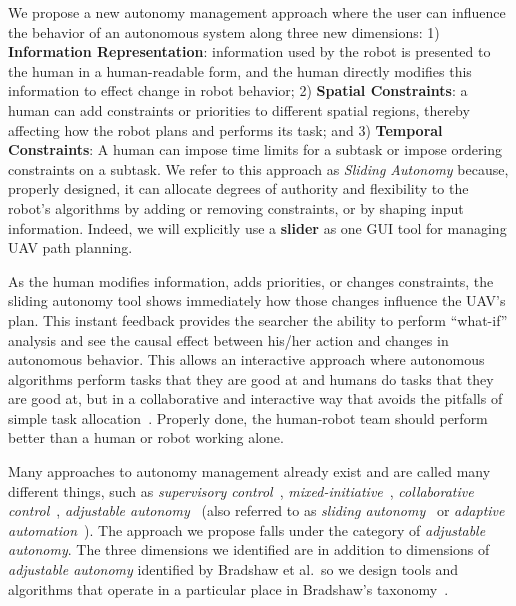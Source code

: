 We propose a new autonomy management approach where the user can influence the behavior of an autonomous system along three new dimensions: 1) \textbf{Information Representation}: information used by the robot is presented to the human in a human-readable form, and the human directly modifies this information to effect change in robot behavior; 2) \textbf{Spatial Constraints}: a human can add constraints or priorities to different spatial regions, thereby affecting how the robot plans and performs its task; and 3) \textbf{Temporal Constraints}: A human can impose time limits for a subtask or impose ordering constraints on a subtask. We refer to this approach as \textit{Sliding Autonomy} because, properly designed, it can allocate degrees of authority and flexibility to the robot's algorithms by adding or removing constraints, or by shaping input information. Indeed, we will explicitly use a \textbf{slider} as one GUI tool for managing UAV path planning.

As the human modifies information, adds priorities, or changes constraints, the sliding autonomy tool shows immediately how those changes influence the UAV's plan. This instant feedback provides the searcher the ability to perform ``what-if'' analysis and see the causal effect between his/her action and changes in autonomous behavior. This allows an interactive approach where autonomous algorithms perform tasks that they are good at and humans do tasks that they are good at, but in a collaborative and interactive way that avoids the pitfalls of simple task allocation~\cite{Sheridan1992Telerobotics,Bradshaw2013Seven}. Properly done, the human-robot team should perform better than a human or robot working alone. 

Many approaches to autonomy management already exist and are called many different things, such as \textit{supervisory control}~\cite{Sheridan1992Telerobotics}, \textit{mixed-initiative}~\cite{Hearst1999Mixed}, \textit{collaborative control}~\cite{Fong1999Collaborative}, \textit{adjustable autonomy}~\cite{Dorais1998AdjustableAutonomy,Dorais2001Designing} (also referred to as \textit{sliding autonomy}~\cite{Dias2008SlidingAutonomy} or \textit{adaptive automation}~\cite{Rouse1988Adaptive,Kaber2001Design}). The approach we propose falls under the category of \textit{adjustable autonomy}. The three dimensions we identified are in addition to dimensions of \textit{adjustable autonomy} identified by Bradshaw et al.\, so we design tools and algorithms that operate in a particular place in Bradshaw's taxonomy~\cite{Bradshaw2004Dimensions}.

